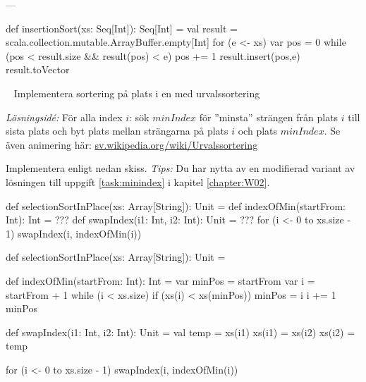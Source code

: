 \SOLUTION

\TaskSolved \what


\SubtaskSolved ---

\SubtaskSolved

\begin{Code}
def insertionSort(xs: Seq[Int]): Seq[Int] = {
  val result = scala.collection.mutable.ArrayBuffer.empty[Int]
  for (e <- xs) {
    var pos = 0
    while (pos < result.size && result(pos) < e) pos += 1
    result.insert(pos,e)
  }
  result.toVector
}
\end{Code}

\QUESTEND






\QUESTBEGIN

\Task  \what~ Implementera sortering på plats  i en  med urvalssortering 

\emph{Lösningsidé:} För alla index $i$: sök $minIndex$ för ''minsta'' strängen från plats $i$ till sista plats och byt plats mellan strängarna på plats $i$ och plats $minIndex$. Se även animering här: \href{https://sv.wikipedia.org/wiki/Urvalssortering}{sv.wikipedia.org/wiki/Urvalssortering}

Implementera enligt nedan skiss.  \emph{Tips:} Du har nytta av en modifierad variant av lösningen till uppgift \ref{task:minindex} i kapitel \ref{chapter:W02}.
\begin{Code}
def selectionSortInPlace(xs: Array[String]): Unit = {
  def indexOfMin(startFrom: Int): Int = ???
  def swapIndex(i1: Int, i2: Int): Unit = ???
  for (i <- 0 to xs.size - 1) swapIndex(i, indexOfMin(i))
}
\end{Code}




\SOLUTION


\TaskSolved \what


\begin{Code}
def selectionSortInPlace(xs: Array[String]): Unit = {

  def indexOfMin(startFrom: Int): Int = {
    var minPos = startFrom
    var i = startFrom + 1
    while (i < xs.size) {
      if (xs(i) < xs(minPos)) minPos = i
      i += 1
    }
    minPos
  }

  def swapIndex(i1: Int, i2: Int): Unit = {
    val temp = xs(i1)
    xs(i1) = xs(i2)
    xs(i2) = temp
  }

  for (i <- 0 to xs.size - 1) swapIndex(i, indexOfMin(i))
}
\end{Code}


